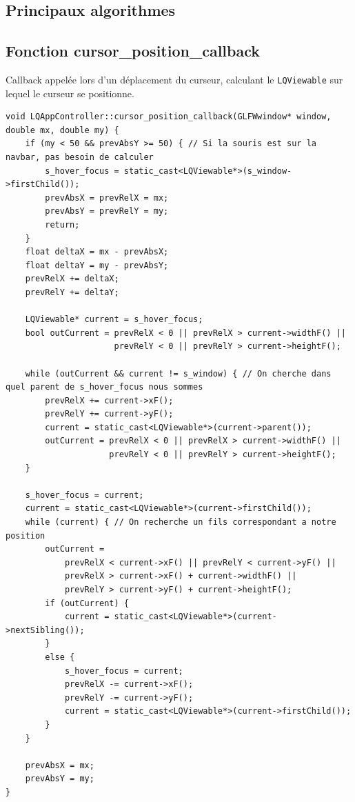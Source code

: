 \documentclass[twoside]{report}
\begin{document}
\begin{appendix}
\chapter{Principaux algorithmes}
\section{Fonction cursor\_position\_callback}
Callback appelée lors d'un déplacement du curseur, calculant le \verb!LQViewable! sur lequel le curseur se positionne.
\begin{lstlisting}[style=cpp, caption=LQAppController::cursor\_position\_callback, label=cpc]
void LQAppController::cursor_position_callback(GLFWwindow* window, double mx, double my) {
    if (my < 50 && prevAbsY >= 50) { // Si la souris est sur la navbar, pas besoin de calculer
        s_hover_focus = static_cast<LQViewable*>(s_window->firstChild());
        prevAbsX = prevRelX = mx;
        prevAbsY = prevRelY = my;
        return;
    }
    float deltaX = mx - prevAbsX;
    float deltaY = my - prevAbsY;
    prevRelX += deltaX;
    prevRelY += deltaY;

    LQViewable* current = s_hover_focus;
    bool outCurrent = prevRelX < 0 || prevRelX > current->widthF() ||
                      prevRelY < 0 || prevRelY > current->heightF();

    while (outCurrent && current != s_window) { // On cherche dans quel parent de s_hover_focus nous sommes
        prevRelX += current->xF();
        prevRelY += current->yF();
        current = static_cast<LQViewable*>(current->parent());
        outCurrent = prevRelX < 0 || prevRelX > current->widthF() ||
                     prevRelY < 0 || prevRelY > current->heightF();
    }

    s_hover_focus = current;
    current = static_cast<LQViewable*>(current->firstChild());
    while (current) { // On recherche un fils correspondant a notre position
        outCurrent =
            prevRelX < current->xF() || prevRelY < current->yF() ||
            prevRelX > current->xF() + current->widthF() ||
            prevRelY > current->yF() + current->heightF();
        if (outCurrent) {
            current = static_cast<LQViewable*>(current->nextSibling());
        }
        else {
            s_hover_focus = current;
            prevRelX -= current->xF();
            prevRelY -= current->yF();
            current = static_cast<LQViewable*>(current->firstChild());
        }
    }

    prevAbsX = mx;
    prevAbsY = my;
}
\end{lstlisting}


\end{appendix}
\end{document}
